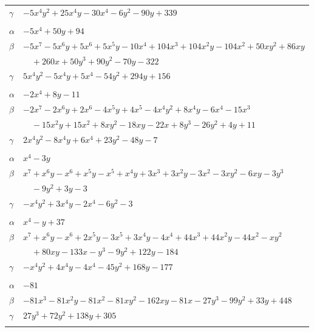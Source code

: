 \documentclass[11pt]{article}
\begin{document}
\begin{longtable}{@{}ll@{}}
$\gamma$ & $-5x^{4}y^{2}+25x^{4}y-30x^{4}-6y^{2}-90y+339$\\
\addlinespace[3pt]
\multicolumn{2}{@{}l}{$\{i,j\}=\{7,26\}$, $k_{ij}=2^{3}\cdot 3^{2}$}\\
$\alpha$ & $-5x^{4}+50y+94$\\
$\beta$ & $-5x^{7}-5x^{6}y+5x^{6}+5x^{5}y-10x^{4}+104x^{3}+104x^{2}y-104x^{2}+50xy^{2}+86xy$\\
 & $\quad +260x+50y^{3}+90y^{2}-70y-322$\\
$\gamma$ & $5x^{4}y^{2}-5x^{4}y+5x^{4}-54y^{2}+294y+156$\\
\addlinespace[3pt]
\multicolumn{2}{@{}l}{$\{i,j\}=\{7,29\}$, $k_{ij}=2\cdot 7$}\\
$\alpha$ & $-2x^{4}+8y-11$\\
$\beta$ & $-2x^{7}-2x^{6}y+2x^{6}-4x^{5}y+4x^{5}-4x^{4}y^{2}+8x^{4}y-6x^{4}-15x^{3}$\\
 & $\quad -15x^{2}y+15x^{2}+8xy^{2}-18xy-22x+8y^{3}-26y^{2}+4y+11$\\
$\gamma$ & $2x^{4}y^{2}-8x^{4}y+6x^{4}+23y^{2}-48y-7$\\
\addlinespace[3pt]
\multicolumn{2}{@{}l}{$\{i,j\}=\{7,34\}$, $k_{ij}=3^{2}$}\\
$\alpha$ & $x^{4}-3y$\\
$\beta$ & $x^{7}+x^{6}y-x^{6}+x^{5}y-x^{5}+x^{4}y+3x^{3}+3x^{2}y-3x^{2}-3xy^{2}-6xy-3y^{3}$\\
 & $\quad -9y^{2}+3y-3$\\
$\gamma$ & $-x^{4}y^{2}+3x^{4}y-2x^{4}-6y^{2}-3$\\
\addlinespace[3pt]
\multicolumn{2}{@{}l}{$\{i,j\}=\{7,35\}$, $k_{ij}=2^{2}\cdot 3^{4}$}\\
$\alpha$ & $x^{4}-y+37$\\
$\beta$ & $x^{7}+x^{6}y-x^{6}+2x^{5}y-3x^{5}+3x^{4}y-4x^{4}+44x^{3}+44x^{2}y-44x^{2}-xy^{2}$\\
 & $\quad +80xy-133x-y^{3}-9y^{2}+122y-184$\\
$\gamma$ & $-x^{4}y^{2}+4x^{4}y-4x^{4}-45y^{2}+168y-177$\\
\addlinespace[3pt]
\multicolumn{2}{@{}l}{$\{i,j\}=\{8,18\}$, $k_{ij}=2^{5}\cdot 7$}\\
$\alpha$ & $-81$\\
$\beta$ & $-81x^{3}-81x^{2}y-81x^{2}-81xy^{2}-162xy-81x-27y^{3}-99y^{2}+33y+448$\\
$\gamma$ & $27y^{3}+72y^{2}+138y+305$\\
\addlinespace[3pt]
\multicolumn{2}{@{}l}{$\{i,j\}=\{8,20\}$, $k_{ij}=1$}\\

\end{longtable}
\end{document}
